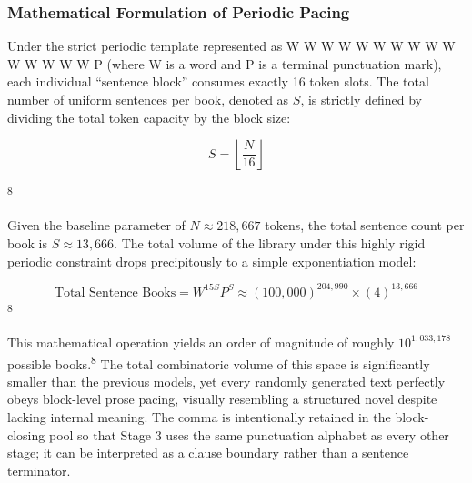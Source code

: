 \documentclass[
  11pt,
  a4paper,
]{article}
\begin{document}
\subsubsection{Mathematical Formulation of Periodic Pacing}\label{mathematical-formulation-of-periodic-pacing}

Under the strict periodic template represented as W W W W W W W W W W W W W W W P (where W is a word and P is a terminal punctuation mark), each individual ``sentence block'' consumes exactly 16 token slots. The total number of uniform sentences per book, denoted as \(S\), is strictly defined by dividing the total token capacity by the block size:

\[
S = \left\lfloor \frac{N}{16} \right\rfloor
\]

\textsuperscript{8}

Given the baseline parameter of \(N \approx 218,667\) tokens, the total sentence count per book is \(S \approx 13,666\). The total volume of the library under this highly rigid periodic constraint drops precipitously to a simple exponentiation model:

\[
\text{Total Sentence Books}=W^{15S}P^S \approx (100,000)^{204,990} \times (4)^{13,666}
\]
\textsuperscript{8}

This mathematical operation yields an order of magnitude of roughly \(10^{1,033,178}\) possible books.\textsuperscript{8} The total combinatoric volume of this space is significantly smaller than the previous models, yet every randomly generated text perfectly obeys block-level prose pacing, visually resembling a structured novel despite lacking internal meaning. The comma is intentionally retained in the block-closing pool so that Stage 3 uses the same punctuation alphabet as every other stage; it can be interpreted as a clause boundary rather than a sentence terminator.
\end{document}
